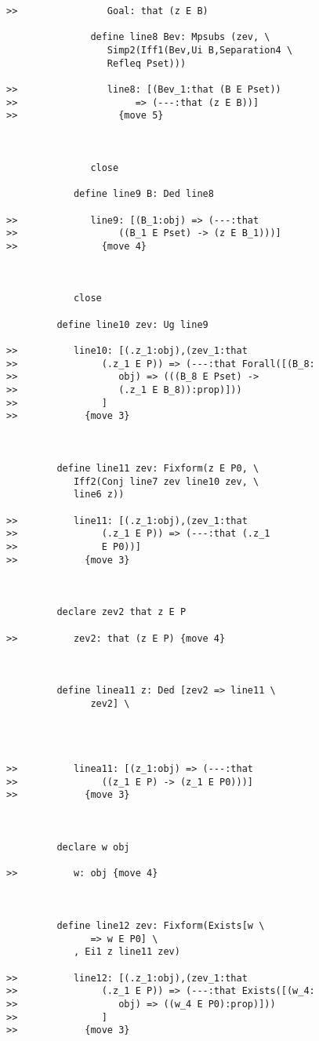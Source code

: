 \documentclass[12pt]{article}
\begin{document}
\begin{verbatim}
>>                Goal: that (z E B)

               define line8 Bev: Mpsubs (zev, \
                  Simp2(Iff1(Bev,Ui B,Separation4 \
                  Refleq Pset)))

>>                line8: [(Bev_1:that (B E Pset))
>>                     => (---:that (z E B))]
>>                  {move 5}



               close

            define line9 B: Ded line8

>>             line9: [(B_1:obj) => (---:that
>>                  ((B_1 E Pset) -> (z E B_1)))]
>>               {move 4}



            close

         define line10 zev: Ug line9

>>          line10: [(.z_1:obj),(zev_1:that
>>               (.z_1 E P)) => (---:that Forall([(B_8:
>>                  obj) => (((B_8 E Pset) ->
>>                  (.z_1 E B_8)):prop)]))
>>               ]
>>            {move 3}



         define line11 zev: Fixform(z E P0, \
            Iff2(Conj line7 zev line10 zev, \
            line6 z))

>>          line11: [(.z_1:obj),(zev_1:that
>>               (.z_1 E P)) => (---:that (.z_1
>>               E P0))]
>>            {move 3}



         declare zev2 that z E P

>>          zev2: that (z E P) {move 4}



         define linea11 z: Ded [zev2 => line11 \
               zev2] \
            



>>          linea11: [(z_1:obj) => (---:that
>>               ((z_1 E P) -> (z_1 E P0)))]
>>            {move 3}



         declare w obj

>>          w: obj {move 4}



         define line12 zev: Fixform(Exists[w \
               => w E P0] \
            , Ei1 z line11 zev)

>>          line12: [(.z_1:obj),(zev_1:that
>>               (.z_1 E P)) => (---:that Exists([(w_4:
>>                  obj) => ((w_4 E P0):prop)]))
>>               ]
>>            {move 3}




\end{verbatim}
\end{document}
